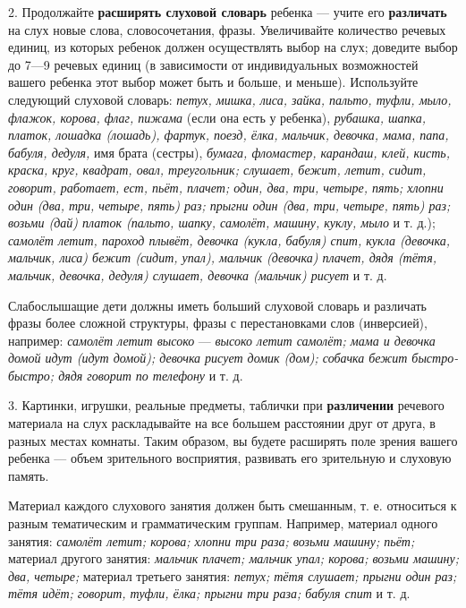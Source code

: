 \documentclass{book}
\renewcommand{\emph}[1]{\textit{#1}}
\begin{document}
2. Продолжайте \textbf{расширять слуховой словарь} ребенка --- учите его
\textbf{различать} на слух новые слова, словосочетания, фразы.
Увеличивайте количество речевых единиц, из которых ребенок должен
осуществлять выбор на слух; доведите выбор до 7---9 речевых единиц (в
зависимости от индивидуальных возможностей вашего ребенка этот выбор
может быть и больше, и меньше). Используйте следующий слуховой словарь:
\emph{петух, мишка, лиса, зайка, пальто, туфли, мыло, флажок, корова,
флаг, пижама} (если она есть у ребенка), \emph{рубашка, шапка, платок,
лошадка (лошадь), фартук, поезд, ёлка, мальчик, девочка, мама, папа,
бабуля, дедуля,} имя брата (сестры), \emph{бумага, фломастер, карандаш,
клей, кисть, краска, круг, квадрат, овал, треугольник; слушает, бежит,
летит, сидит, говорит, работает, ест, пьёт, плачет; один, два, три,
четыре, пять; хлопни один (два, три, четыре, пять) раз; прыгни один
(два, три, четыре, пять) раз; возьми (дай) платок (пальто, шапку,
самолёт, машину, куклу, мыло} и т. д.); \emph{самолёт летит, пароход
плывёт, девочка (кукла, бабуля) спит, кукла (девочка, мальчик, лиса)
бежит (сидит, упал), мальчик (девочка) плачет, дядя (тётя, мальчик,
девочка, дедуля) слушает, девочка (мальчик) рисует} и т. д.

Слабослышащие дети должны иметь больший слуховой словарь и различать
фразы более сложной структуры, фразы с перестановками слов (инверсией),
например: \emph{самолёт летит высоко} --- \emph{высоко летит самолёт;
мама и девочка домой идут (идут домой); девочка рисует домик (дом);
собачка бежит быстро-быстро; дядя говорит по телефону} и т. д.

3. Картинки, игрушки, реальные предметы, таблички при
\textbf{различении} речевого материала на слух раскладывайте на все
большем расстоянии друг от друга, в разных местах комнаты. Таким
образом, вы будете расширять поле зрения вашего ребенка --- объем
зрительного восприятия, развивать его зрительную и слуховую память.

Материал каждого слухового занятия должен быть смешанным, т. е.
относиться к разным тематическим и грамматическим группам. Например,
материал одного занятия: \emph{самолёт летит; корова; хлопни три раза;
возьми машину; пьёт;} материал другого занятия: \emph{мальчик плачет;
мальчик упал; корова; возьми машину; два, четыре;} материал третьего
занятия: \emph{петух; тётя слушает; прыгни один раз; тётя идёт; говорит,
туфли, ёлка; прыгни три раза; бабуля спит} и т. д.
\end{document}
